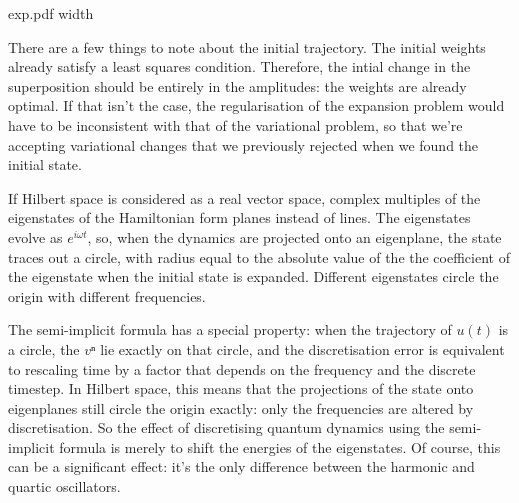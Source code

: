 \centerline{\XeTeXpicfile exp.pdf width \hsize}

There are a few things to note about the initial trajectory.  The initial weights already satisfy a least squares condition.  Therefore, the intial change in the superposition should be entirely in the amplitudes: the weights are already optimal.  If that isn't the case, the regularisation of the expansion problem would have to be inconsistent with that of the variational problem, so that we're accepting variational changes that we previously rejected when we found the initial state.





If Hilbert space is considered as a real vector space, complex multiples of the eigenstates of the Hamiltonian form planes instead of lines.  The eigenstates evolve as $e^{iωt}$, so, when the dynamics are projected onto an eigenplane, the state traces out a circle, with radius equal to the absolute value of the the coefficient of the eigenstate when the initial state is expanded.  Different eigenstates circle the origin with different frequencies.

The semi-implicit formula has a special property: when the trajectory of $u(t)$ is a circle, the $vⁿ$ lie exactly on that circle, and the discretisation error is equivalent to rescaling time by a factor that depends on the frequency and the discrete timestep.  In Hilbert space, this means that the projections of the state onto eigenplanes still circle the origin exactly: only the frequencies are altered by discretisation.  So the effect of discretising quantum dynamics using the semi-implicit formula is merely to shift the energies of the eigenstates.  Of course, this can be a significant effect: it's the only difference between the harmonic and quartic oscillators.


